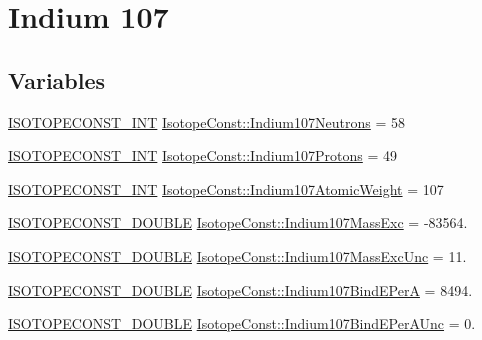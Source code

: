 \hypertarget{group___isotope_const-_indium-_in107}{}\section{Indium 107}
\label{group___isotope_const-_indium-_in107}
\subsection*{Variables}
\begin{DoxyCompactItemize}
\item 
\mbox{\hyperlink{group___isotope_const-_macros_ga5f18360b3e99483a35c32d789e62621c}{I\+S\+O\+T\+O\+P\+E\+C\+O\+N\+S\+T\+\_\+\+I\+NT}} \mbox{\hyperlink{group___isotope_const-_indium-_in107_ga14d36a5ad5738aed94b7bfbe693535c9}{Isotope\+Const\+::\+Indium107\+Neutrons}} = 58
\item 
\mbox{\hyperlink{group___isotope_const-_macros_ga5f18360b3e99483a35c32d789e62621c}{I\+S\+O\+T\+O\+P\+E\+C\+O\+N\+S\+T\+\_\+\+I\+NT}} \mbox{\hyperlink{group___isotope_const-_indium-_in107_gae3c13445b817ea3cc24db5f94591039e}{Isotope\+Const\+::\+Indium107\+Protons}} = 49
\item 
\mbox{\hyperlink{group___isotope_const-_macros_ga5f18360b3e99483a35c32d789e62621c}{I\+S\+O\+T\+O\+P\+E\+C\+O\+N\+S\+T\+\_\+\+I\+NT}} \mbox{\hyperlink{group___isotope_const-_indium-_in107_ga16b942c3bc292ff6b66d2afab197c1ca}{Isotope\+Const\+::\+Indium107\+Atomic\+Weight}} = 107
\item 
\mbox{\hyperlink{group___isotope_const-_macros_ga8f45a7272ce02c0b4c65c44636ed719a}{I\+S\+O\+T\+O\+P\+E\+C\+O\+N\+S\+T\+\_\+\+D\+O\+U\+B\+LE}} \mbox{\hyperlink{group___isotope_const-_indium-_in107_gabe8b63c2b205c4848ff653df11e4f35d}{Isotope\+Const\+::\+Indium107\+Mass\+Exc}} = -\/83564.
\item 
\mbox{\hyperlink{group___isotope_const-_macros_ga8f45a7272ce02c0b4c65c44636ed719a}{I\+S\+O\+T\+O\+P\+E\+C\+O\+N\+S\+T\+\_\+\+D\+O\+U\+B\+LE}} \mbox{\hyperlink{group___isotope_const-_indium-_in107_gac3e6e06d415e64bf0142935467f272ce}{Isotope\+Const\+::\+Indium107\+Mass\+Exc\+Unc}} = 11.
\item 
\mbox{\hyperlink{group___isotope_const-_macros_ga8f45a7272ce02c0b4c65c44636ed719a}{I\+S\+O\+T\+O\+P\+E\+C\+O\+N\+S\+T\+\_\+\+D\+O\+U\+B\+LE}} \mbox{\hyperlink{group___isotope_const-_indium-_in107_gac9a52c53925d72029847f3d1cd7e4387}{Isotope\+Const\+::\+Indium107\+Bind\+E\+PerA}} = 8494.
\item 
\mbox{\hyperlink{group___isotope_const-_macros_ga8f45a7272ce02c0b4c65c44636ed719a}{I\+S\+O\+T\+O\+P\+E\+C\+O\+N\+S\+T\+\_\+\+D\+O\+U\+B\+LE}} \mbox{\hyperlink{group___isotope_const-_indium-_in107_ga3b2fa7791f77e510d0b8fe4bac0fe827}{Isotope\+Const\+::\+Indium107\+Bind\+E\+Per\+A\+Unc}} = 0.

\end{DoxyCompactItemize}
